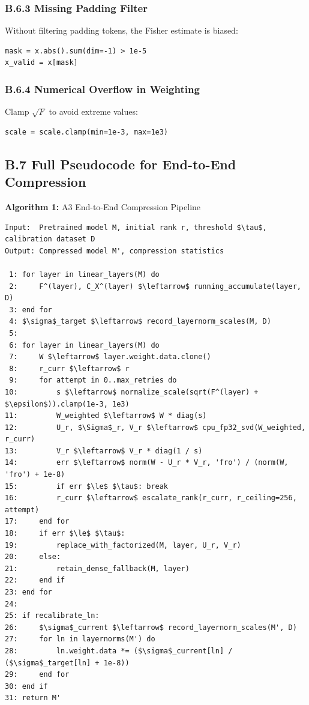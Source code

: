 \subsubsection{B.6.3 Missing Padding Filter}

Without filtering padding tokens, the Fisher estimate is biased:

\begin{lstlisting}
mask = x.abs().sum(dim=-1) > 1e-5
x_valid = x[mask]
\end{lstlisting}

\subsubsection{B.6.4 Numerical Overflow in Weighting}

Clamp $\sqrt{F}$ to avoid extreme values:

\begin{lstlisting}
scale = scale.clamp(min=1e-3, max=1e3)
\end{lstlisting}

\subsection{B.7 Full Pseudocode for End-to-End Compression}
\label{sec:app_algorithm1}

\textbf{Algorithm 1:} A3 End-to-End Compression Pipeline
\begin{lstlisting}
Input:  Pretrained model M, initial rank r, threshold $\tau$, calibration dataset D
Output: Compressed model M', compression statistics

 1: for layer in linear_layers(M) do
 2:     F^(layer), C_X^(layer) $\leftarrow$ running_accumulate(layer, D)
 3: end for
 4: $\sigma$_target $\leftarrow$ record_layernorm_scales(M, D)
 5:
 6: for layer in linear_layers(M) do
 7:     W $\leftarrow$ layer.weight.data.clone()
 8:     r_curr $\leftarrow$ r
 9:     for attempt in 0..max_retries do
10:         s $\leftarrow$ normalize_scale(sqrt(F^(layer) + $\epsilon$)).clamp(1e-3, 1e3)
11:         W_weighted $\leftarrow$ W * diag(s)
12:         U_r, $\Sigma$_r, V_r $\leftarrow$ cpu_fp32_svd(W_weighted, r_curr)
13:         V_r $\leftarrow$ V_r * diag(1 / s)
14:         err $\leftarrow$ norm(W - U_r * V_r, 'fro') / (norm(W, 'fro') + 1e-8)
15:         if err $\le$ $\tau$: break
16:         r_curr $\leftarrow$ escalate_rank(r_curr, r_ceiling=256, attempt)
17:     end for
18:     if err $\le$ $\tau$:
19:         replace_with_factorized(M, layer, U_r, V_r)
20:     else:
21:         retain_dense_fallback(M, layer)
22:     end if
23: end for
24:
25: if recalibrate_ln:
26:     $\sigma$_current $\leftarrow$ record_layernorm_scales(M', D)
27:     for ln in layernorms(M') do
28:         ln.weight.data *= ($\sigma$_current[ln] / ($\sigma$_target[ln] + 1e-8))
29:     end for
30: end if
31: return M'
\end{lstlisting}

